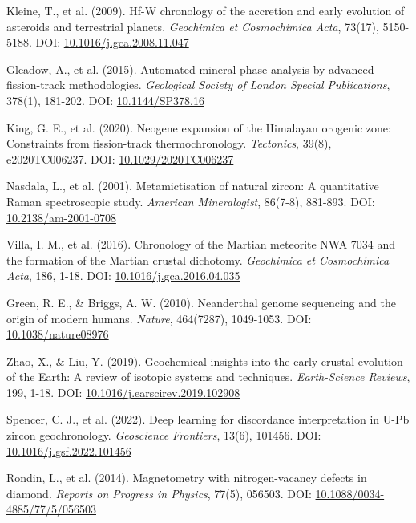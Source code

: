 \documentclass{article}
\begin{document}
\begin{thebibliography}{9}
Kleine, T., et al. (2009). Hf-W chronology of the accretion and early evolution of asteroids and terrestrial planets. \textit{Geochimica et Cosmochimica Acta}, 73(17), 5150-5188.  
DOI: \href{https://doi.org/10.1016/j.gca.2008.11.047}{10.1016/j.gca.2008.11.047}


Gleadow, A., et al. (2015). Automated mineral phase analysis by advanced fission-track methodologies. \textit{Geological Society of London Special Publications}, 378(1), 181-202.  
DOI: \href{https://doi.org/10.1144/SP378.16}{10.1144/SP378.16}

King, G. E., et al. (2020). Neogene expansion of the Himalayan orogenic zone: Constraints from fission-track thermochronology. \textit{Tectonics}, 39(8), e2020TC006237.  
DOI: \href{https://doi.org/10.1029/2020TC006237}{10.1029/2020TC006237}

Nasdala, L., et al. (2001). Metamictisation of natural zircon: A quantitative Raman spectroscopic study. \textit{American Mineralogist}, 86(7-8), 881-893.  
DOI: \href{https://doi.org/10.2138/am-2001-0708}{10.2138/am-2001-0708}

Villa, I. M., et al. (2016). Chronology of the Martian meteorite NWA 7034 and the formation of the Martian crustal dichotomy. \textit{Geochimica et Cosmochimica Acta}, 186, 1-18.  
DOI: \href{https://doi.org/10.1016/j.gca.2016.04.035}{10.1016/j.gca.2016.04.035}

Green, R. E., & Briggs, A. W. (2010). Neanderthal genome sequencing and the origin of modern humans. \textit{Nature}, 464(7287), 1049-1053. DOI: \href{https://doi.org/10.1038/nature08976}{10.1038/nature08976}

Zhao, X., & Liu, Y. (2019). Geochemical insights into the early crustal evolution of the Earth: A review of isotopic systems and techniques. \textit{Earth-Science Reviews}, 199, 1-18. DOI: \href{https://doi.org/10.1016/j.earscirev.2019.102908}{10.1016/j.earscirev.2019.102908}


Spencer, C. J., et al. (2022). Deep learning for discordance interpretation in U-Pb zircon geochronology. \textit{Geoscience Frontiers}, 13(6), 101456.  
DOI: \href{https://doi.org/10.1016/j.gsf.2022.101456}{10.1016/j.gsf.2022.101456}

Rondin, L., et al. (2014). Magnetometry with nitrogen-vacancy defects in diamond. \textit{Reports on Progress in Physics}, 77(5), 056503.  
DOI: \href{https://doi.org/10.1088/0034-4885/77/5/056503}{10.1088/0034-4885/77/5/056503}


\end{thebibliography}
\end{document}
